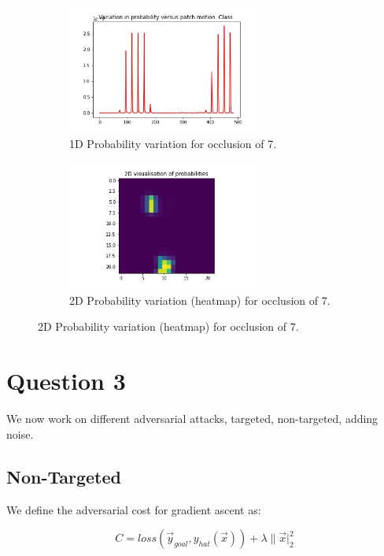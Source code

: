 \begin{figure}[!htbp]
\begin{subfigure}
\centering
\includegraphics[angle=0,width=0.7\textwidth]{assign-2/logs/occ/1d-var-7.jpg}
\caption{1D Probability variation for occlusion of 7.}
\end{subfigure}
\begin{subfigure}
\centering
\includegraphics[angle=0,width=0.7\textwidth]{assign-2/logs/occ/2d-var-7.jpg}
\caption{2D Probability variation (heatmap) for occlusion of 7.}
\end{subfigure}
\end{figure}

\section{Question 3 }

We now work on different adversarial attacks, targeted, non-targeted, adding noise. 

\subsection{Non-Targeted}

We define the adversarial cost for gradient ascent as:

$$ C = loss(\vec y_{goal}, y_{hat}(\vec x))+ \lambda \|\vec x |^2_2 $$

